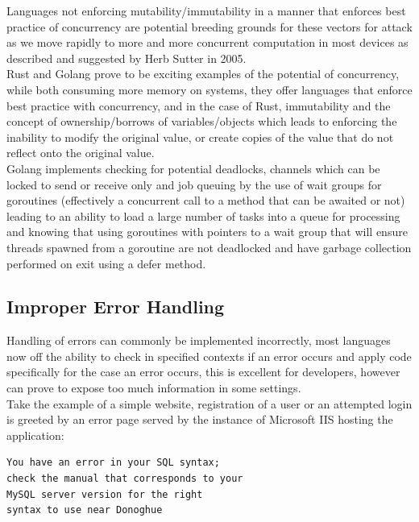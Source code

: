 \documentclass{IEEEtran}
\begin{document}
            Languages not enforcing mutability/immutability in a manner that enforces best practice 
            of concurrency are potential breeding grounds for these vectors for attack as we move 
            rapidly to more and more concurrent computation in most devices as described and 
            suggested by Herb Sutter\cite{Herb-Sutter} in 2005.
            \medskip
            \\
            Rust\cite{Rust} and Golang\cite{Golang} prove to be exciting examples of the potential
            of concurrency, while both consuming more memory on systems, they offer languages 
            that enforce best practice with concurrency\cite{sima2012secure}, and in the case of Rust, immutability and
            the concept of ownership/borrows of variables/objects which leads to enforcing the 
            inability to modify the original value, or create copies of the value that do not
            reflect onto the original value.
            \medskip
            \\            
            Golang implements checking for potential deadlocks, channels which can be locked to send or receive only and job queuing by the use of wait groups for goroutines
            (effectively a concurrent call to a method that can be awaited or not) leading to 
            an ability to load a large number of tasks into a queue for processing and knowing 
            that using goroutines with pointers to a wait group that will ensure threads spawned
            from a goroutine are not deadlocked and have garbage collection performed on exit 
            using a defer method.

        \subsection{Improper Error Handling}
            Handling of errors can commonly be implemented incorrectly, most languages now off the 
            ability to check in specified contexts if an error occurs and apply code specifically 
            for the case an error occurs, this is excellent for developers, however can prove to 
            expose too much information in some settings. 
            \medskip
            \\
            Take the example of a simple website, registration of a user or an attempted login is 
            greeted by an error page served by the instance of Microsoft IIS hosting the application:

            \begin{verbatim}
You have an error in your SQL syntax; 
check the manual that corresponds to your 
MySQL server version for the right 
syntax to use near Donoghue
            \end{verbatim}
\end{document}
